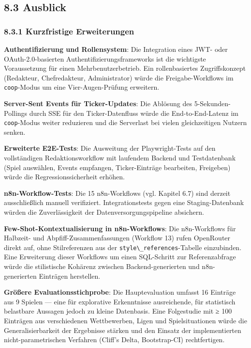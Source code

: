\subsection{8.3 Ausblick}\label{ausblick}

\subsubsection{8.3.1 Kurzfristige
Erweiterungen}\label{kurzfristige-erweiterungen}

\textbf{Authentifizierung und Rollensystem}: Die Integration eines JWT-
oder OAuth-2.0-basierten Authentifizierungsframeworks ist die wichtigste
Voraussetzung für einen Mehrbenutzerbetrieb. Ein rollenbasiertes
Zugriffskonzept (Redakteur, Chefredakteur, Administrator) würde die
Freigabe-Workflows im \passthrough{\lstinline!coop!}-Modus um eine
Vier-Augen-Prüfung erweitern.

\textbf{Server-Sent Events für Ticker-Updates}: Die Ablösung des
5-Sekunden-Pollings durch SSE für den Ticker-Datenfluss würde die
End-to-End-Latenz im \passthrough{\lstinline!coop!}-Modus weiter
reduzieren und die Serverlast bei vielen gleichzeitigen Nutzern senken.

\textbf{Erweiterte E2E-Tests}: Die Ausweitung der Playwright-Tests auf
den vollständigen Redaktionsworkflow mit laufendem Backend und
Testdatenbank (Spiel auswählen, Events empfangen, Ticker-Einträge
bearbeiten, Freigeben) würde die Regressionssicherheit erhöhen.

\textbf{n8n-Workflow-Tests}: Die 15 n8n-Workflows (vgl. Kapitel 6.7)
sind derzeit ausschließlich manuell verifiziert. Integrationstests gegen
eine Staging-Datenbank würden die Zuverlässigkeit der
Datenversorgungspipeline absichern.

\textbf{Few-Shot-Kontextualisierung in n8n-Workflows}: Die n8n-Workflows
für Halbzeit- und Abpfiff-Zusammenfassungen (Workflow 13) rufen
OpenRouter direkt auf, ohne Stilreferenzen aus der
\passthrough{\lstinline!style\_references!}-Tabelle einzubinden. Eine
Erweiterung dieser Workflows um einen SQL-Schritt zur Referenzabfrage
würde die stilistische Kohärenz zwischen Backend-generierten und
n8n-generierten Einträgen herstellen.

\textbf{Größere Evaluationsstichprobe}: Die Hauptevaluation umfasst 16
Einträge aus 9 Spielen --- eine für explorative Erkenntnisse
ausreichende, für statistisch belastbare Aussagen jedoch zu kleine
Datenbasis. Eine Folgestudie mit ≥ 100 Einträgen aus verschiedenen
Wettbewerben, Ligen und Spielsituationen würde die Generalisierbarkeit
der Ergebnisse stärken und den Einsatz der implementierten
nicht-parametrischen Verfahren (Cliff's Delta, Bootstrap-CI)
rechtfertigen.

